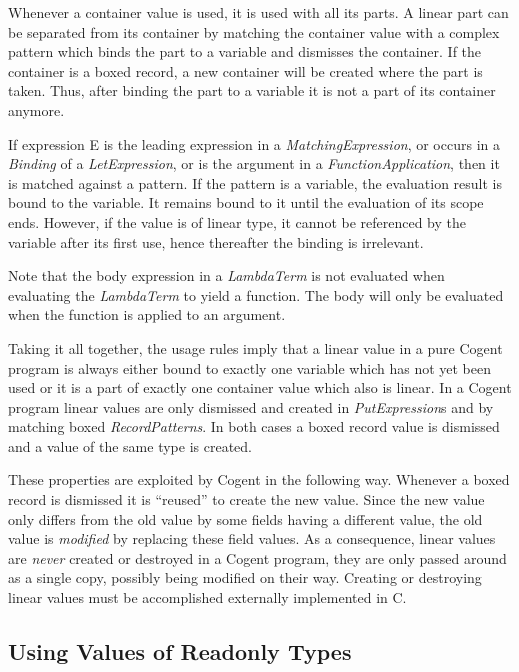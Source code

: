 \documentclass[a4paper]{report}
\newcommand{\cogent}{Cogent\xspace}
\begin{document}
Whenever a container value is used, it is used with all its parts. A linear part can be separated from its container by matching the
container value with a complex pattern which binds the part to a variable and dismisses the container. If the container is a boxed
record, a new container will be created where the part is taken. Thus, after binding the part to a variable 
it is not a part of its container anymore.

If expression E is the leading expression in a \textit{MatchingExpression}, or occurs in a \textit{Binding} of a \textit{LetExpression}, 
or is the argument in a \textit{FunctionApplication},
then it is matched against a pattern. If the pattern is a variable, the evaluation result is bound to the variable. It remains bound to
it until the evaluation of its scope ends. However, if the value is of linear type, it cannot be referenced by the variable after
its first use, hence thereafter the binding is irrelevant.

Note that the body expression in a \textit{LambdaTerm} is not evaluated when evaluating the \textit{LambdaTerm} to yield a function.
The body will only be evaluated when the function is applied to an argument.

Taking it all together, the usage rules imply that a linear value in a pure \cogent program is always either bound to exactly one variable 
which has not yet been used or it is a part of exactly one container value which also is linear. In a \cogent program linear values are 
only dismissed and created in \textit{PutExpression}s and by matching boxed \textit{RecordPatterns}. In both cases a boxed record value is 
dismissed and a value of the same type is created.

These properties are exploited by \cogent in the following way. Whenever a boxed record is dismissed it is ``reused'' to create the 
new value. Since the new value only differs from the old value by some fields having a different value, the old value is \textit{modified}
by replacing these field values. As a consequence, linear values are \textit{never} created or destroyed in a \cogent program, 
they are only passed around as a single copy, possibly being modified on their way. Creating or destroying linear values must be accomplished 
externally implemented in C.

\subsection{Using Values of Readonly Types}
\end{document}
